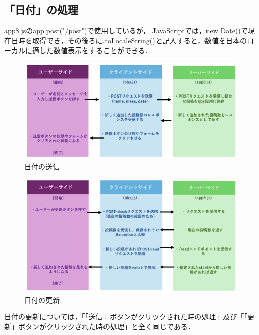 \documentclass[uplatex,dvipdfmx]{jsarticle}
\begin{document}
\clearpage
\subsection{「日付」の処理}
app8.jsのapp.post("/post")で使用しているが，
JavaScriptでは，new Date()で現在日時を取得でき，その後ろに.toLocaleString()と記入すると，数値を日本のローカルに適した数値表示をすることができる．

\begin{figure}[h]
    \centering
    \includegraphics[width=14cm]{送信.png}
    \caption{日付の送信}
    \label{fig:日付の送信}
\end{figure}

\begin{figure}[h]
    \centering
    \includegraphics[width=14cm]{更新.png}
    \caption{日付の更新}
    \label{fig:日付の更新}
\end{figure}
日付の更新については，「「送信」ボタンがクリックされた時の処理」及び「「更新」ボタンがクリックされた時の処理」と全く同じである．
\clearpage
\end{document}
